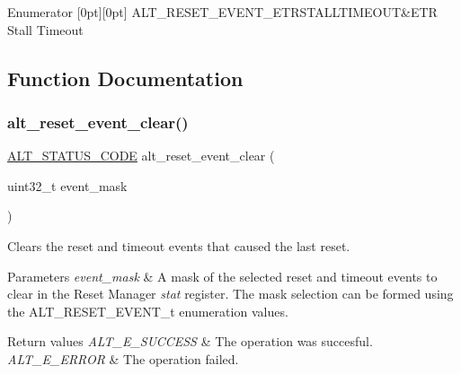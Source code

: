 \begin{DoxyEnumFields}{Enumerator}
[0pt][0pt]{}\mbox{\label{group__RST__MGR__STATUS_ggaec1a3a92fb6ca1987fb805679ebae4efa5dea138047b75d73ae51343a91322c75}} 
A\+L\+T\+\_\+\+R\+E\+S\+E\+T\+\_\+\+E\+V\+E\+N\+T\+\_\+\+E\+T\+R\+S\+T\+A\+L\+L\+T\+I\+M\+E\+O\+UT&E\+TR Stall Timeout \\
\hline

\end{DoxyEnumFields}


\subsection{Function Documentation}
\mbox{\label{group__RST__MGR__STATUS_ga3a92c49f229bae04593073664f56cd35}} 
\subsubsection{\texorpdfstring{alt\_reset\_event\_clear()}{alt\_reset\_event\_clear()}}
{\footnotesize\ttfamily \mbox{\hyperlink{hwlib_8h_abdb0d369f069723ca55d6c94bcaaaa12}{A\+L\+T\+\_\+\+S\+T\+A\+T\+U\+S\+\_\+\+C\+O\+DE}} alt\+\_\+reset\+\_\+event\+\_\+clear (\begin{DoxyParamCaption}\item[{uint32\+\_\+t}]{event\+\_\+mask }\end{DoxyParamCaption})}

Clears the reset and timeout events that caused the last reset.


\begin{DoxyParams}{Parameters}
{\em event\+\_\+mask} & A mask of the selected reset and timeout events to clear in the Reset Manager {\itshape stat} register. The mask selection can be formed using the A\+L\+T\+\_\+\+R\+E\+S\+E\+T\+\_\+\+E\+V\+E\+N\+T\+\_\+t enumeration values.\\
\hline
\end{DoxyParams}

\begin{DoxyRetVals}{Return values}
{\em A\+L\+T\+\_\+\+E\+\_\+\+S\+U\+C\+C\+E\+SS} & The operation was succesful. \\
\hline
{\em A\+L\+T\+\_\+\+E\+\_\+\+E\+R\+R\+OR} & The operation failed. \\
\hline
\end{DoxyRetVals}
\mbox{\label{group__RST__MGR__STATUS_ga325735bfbb9bb88cfac8dd748c381f91}} 
